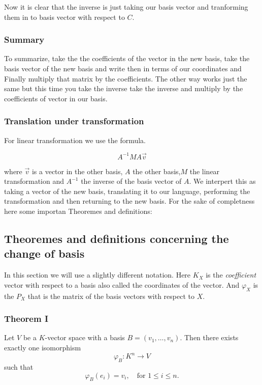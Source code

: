 Now it is clear that the inverse is just taking our basis vector and tranforming
them in to basis vector with respect to \(C\).

\subsubsection*{Summary}

To summarize, take the the coefficients of the vector in the new basis,
take the basis vector of the new basis and write then in terms of our coordinates
and Finally multiply that matrix by the coefficients. The other way works 
just the same but this time you take the inverse take the inverse and multiply
by the coefficients of vector in our basis.

\subsubsection*{Translation under transformation}

For linear transformation we use the formula.

\[A^{-1} M A \vec{v}\]

where \(\vec{v}\) is a vector in the other basis, \(A\) the
other basis,\(M\) the linear transformation and \(A^{-1}\) the inverse of
the basis vector of \(A\).
\newline
We interpert this as taking a vector of the new basis, translating it to our language,
performing the transformation and then returning to the new basis.
\newline
For the sake of completness here some importan Theoremes and definitions:

\subsection{Theoremes and definitions concerning the change of basis}

In this section we will use a slightly different notation. Here \(K_X\) is 
the \emph{coefficient} vector with respect to a basis also called the coordinates
of the vector. And \(\varphi_X\) is the \(P_X\) that is the matrix of the basis vectors with
respect to \(X\).

\subsubsection*{Theorem I} 

Let \( V \) be a \( K \)-vector space with a 
basis \( B = (v_1, \ldots, v_n) \).  
Then there exists exactly one isomorphism 
\[
\varphi_B : K^n \to V
\]
such that
\[
\varphi_B(e_i) = v_i, \quad \text{for } 1 \leq i \leq n.
\]

